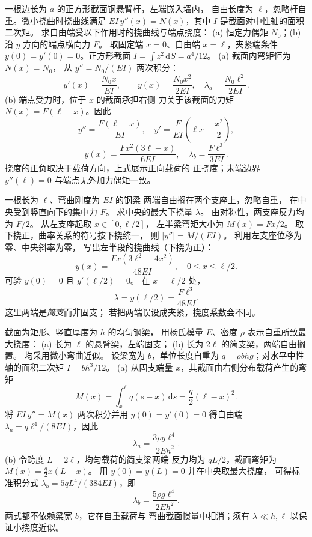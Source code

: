 一根边长为 $a$ 的正方形截面钢悬臂杆，左端嵌入墙内，
自由长度为 $\ell$，忽略杆自重。微小挠曲时挠曲线满足
$EI\,y''(x)=N(x)$，其中 $I$ 是截面对中性轴的面积二次矩。
求自由端受以下作用时的挠曲线与端点挠度：
(a) 恒定力偶矩 $N_0$；(b) 沿 $y$ 方向的端点横向力 $F$。
\exsolution
取固定端 $x=0$、自由端 $x=\ell$，夹紧端条件
$y(0)=y'(0)=0$。正方形截面
$I=\int z^2\,\mathrm dS=a^4/12$。
(a) 截面内弯矩恒为 $N(x)=N_0$，
从 $y''=N_0/(EI)$ 两次积分：
\[
y'(x)=\frac{N_0x}{EI},\qquad
\boxed{y(x)=\frac{N_0x^2}{2EI}},\quad
\boxed{\lambda_a=\frac{N_0\ell^2}{2EI}}.
\]
(b) 端点受力时，位于 $x$ 的截面承担右侧
力关于该截面的力矩 $N(x)=F(\ell-x)$。因此
\[
y''=\frac{F(\ell-x)}{EI},\quad
y'=\frac F{EI}\left(\ell x-\frac{x^2}{2}\right),
\]
\[
\boxed{y(x)=\frac{Fx^2(3\ell-x)}{6EI}},\quad
\boxed{\lambda_b=\frac{F\ell^3}{3EI}}.
\]
\excheck 挠度的正负取决于载荷方向，上式展示正向载荷的
正挠度；末端边界 $y''(\ell)=0$ 与端点无外加力偶矩一致。

一根长为 $\ell$、弯曲刚度为 $EI$ 的钢梁
两端自由搁在两个支座上，忽略自重，
在中央受到竖直向下的集中力 $F$。
求中央的最大下挠量 $\lambda$。
\exsolution
由对称性，两支座反力均为 $F/2$。
从左支座起取 $x\in[0,\ell/2]$，
左半梁弯矩大小为 $M(x)=Fx/2$。
取下挠正，曲率关系的符号按下挠统一，
则 $|y''|=M/(EI)$。
利用左支座位移为零、中央斜率为零，
写出左半段的挠曲线（下挠为正）：
\[
y(x)=\frac{Fx(3\ell^2-4x^2)}{48EI},
\quad 0\le x\le\ell/2.
\]
可验 $y(0)=0$ 且 $y'(\ell/2)=0$。
在 $x=\ell/2$ 处，
\[
\boxed{\lambda=y(\ell/2)=\frac{F\ell^3}{48EI}}.
\]
\excheck 这里两端是\emph{简支}而非固支；
若把两端误设成夹紧，挠度系数会不同。

截面为矩形、竖直厚度为 $h$ 的均匀钢梁，
用杨氏模量 $E$、密度 $\rho$ 表示自重所致最大挠度：
(a) 长为 $\ell$ 的悬臂梁，左端固支；
(b) 长为 $2\ell$ 的简支梁，两端自由搁置。
均采用微小弯曲近似。
\exsolution
设梁宽为 $b$，单位长度自重为
$q=\rho b h g$；对水平中性轴的面积二次矩
$I=bh^3/12$。
(a) 从固支端量 $x$，其截面由右侧分布载荷产生的弯矩
\[
M(x)=\int_x^\ell q(s-x)\,\mathrm ds
=\frac q2(\ell-x)^2.
\]
将 $EI\,y''=M(x)$ 两次积分并用
$y(0)=y'(0)=0$ 得自由端
$\lambda_a=q\ell^4/(8EI)$，因此
\[
\boxed{\lambda_a=\frac{3\rho g\ell^4}{2Eh^2}}.
\]
(b) 令跨度 $L=2\ell$，均匀载荷的简支梁两端
反力均为 $qL/2$，截面弯矩为
$M(x)=\frac q2x(L-x)$。
用 $y(0)=y(L)=0$ 并在中央取最大挠度，
可得标准积分式
$\lambda_b=5qL^4/(384EI)$，即
\[
\boxed{\lambda_b=\frac{5\rho g\ell^4}{2Eh^2}}.
\]
\excheck 两式都不依赖梁宽 $b$，它在自重载荷与
弯曲截面惯量中相消；须有 $\lambda\ll h,\ell$ 以保证小挠度近似。


